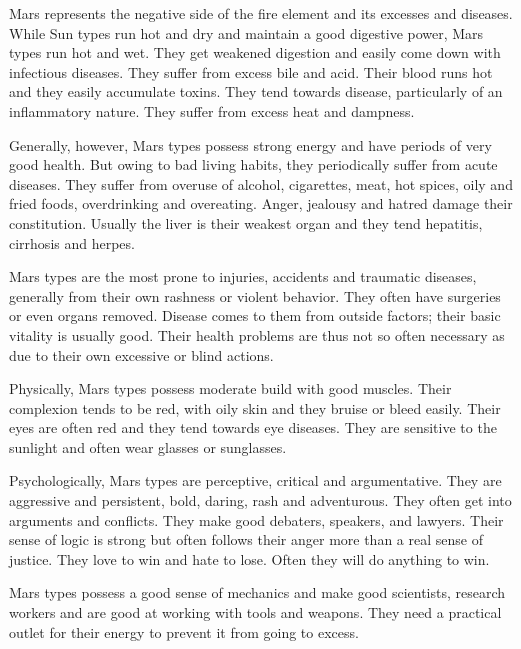 Mars represents the negative side of the fire element and its excesses and diseases. While Sun types run hot and dry and maintain a good digestive power, Mars types run hot and wet. They get weakened digestion and easily come down with infectious diseases. They suffer from excess bile and acid. Their blood runs hot and they easily accumulate toxins. They tend towards disease, particularly of an inflammatory nature. They suffer from excess heat and dampness.

 

Generally, however, Mars types possess strong energy and have periods of very good health. But owing to bad living habits, they periodically suffer from acute diseases. They suffer from overuse of alcohol, cigarettes, meat, hot spices, oily and fried foods, overdrinking and overeating. Anger, jealousy and hatred damage their constitution. Usually the liver is their weakest organ and they tend hepatitis, cirrhosis and herpes.

 

Mars types are the most prone to injuries, accidents and traumatic diseases, generally from their own rashness or violent behavior. They often have surgeries or even organs removed. Disease comes to them from outside factors; their basic vitality is usually good. Their health problems are thus not so often necessary as due to their own excessive or blind actions.

 

Physically, Mars types possess moderate build with good muscles. Their complexion tends to be red, with oily skin and they bruise or bleed easily. Their eyes are often red and they tend towards eye diseases. They are sensitive to the sunlight and often wear glasses or sunglasses.

 

Psychologically, Mars types are perceptive, critical and argumentative. They are aggressive and persistent, bold, daring, rash and adventurous. They often get into arguments and conflicts. They make good debaters, speakers, and lawyers. Their sense of logic is strong but often follows their anger more than a real sense of justice. They love to win and hate to lose. Often they will do anything to win.

 

Mars types possess a good sense of mechanics and make good scientists, research workers and are good at working with tools and weapons. They need a practical outlet for their energy to prevent it from going to excess.

